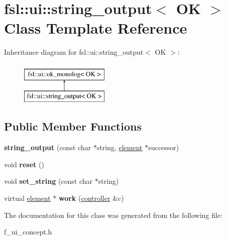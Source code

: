 \hypertarget{classfsl_1_1ui_1_1string__output}{}\section{fsl\+::ui\+::string\+\_\+output$<$ OK $>$ Class Template Reference}
\label{classfsl_1_1ui_1_1string__output}
Inheritance diagram for fsl\+::ui\+::string\+\_\+output$<$ OK $>$\+:\begin{figure}[H]
\begin{center}
\leavevmode
\includegraphics[height=2.000000cm]{classfsl_1_1ui_1_1string__output}
\end{center}
\end{figure}
\subsection*{Public Member Functions}
\begin{DoxyCompactItemize}
\item 
\mbox{\label{classfsl_1_1ui_1_1string__output_a064b0a4a4db91b01c534e4c43425d2f7}} 
{\bfseries string\+\_\+output} (const char $\ast$string, \mbox{\hyperlink{classfsl_1_1ui_1_1element}{element}} $\ast$successor)
\item 
\mbox{\label{classfsl_1_1ui_1_1string__output_aacc91cbaa65c65e58f446d216e318d5c}} 
void {\bfseries reset} ()
\item 
\mbox{\label{classfsl_1_1ui_1_1string__output_a6d0e90b2996cb8ede0fd14277cb212a0}} 
void {\bfseries set\+\_\+string} (const char $\ast$string)
\item 
\mbox{\label{classfsl_1_1ui_1_1string__output_a7aeec3c6b036dd4043a6585f0b162922}} 
virtual \mbox{\hyperlink{classfsl_1_1ui_1_1element}{element}} $\ast$ {\bfseries work} (\mbox{\hyperlink{classfsl_1_1ui_1_1controller}{controller}} \&c)
\end{DoxyCompactItemize}


The documentation for this class was generated from the following file\+:\begin{DoxyCompactItemize}
\item 
f\+\_\+ui\+\_\+concept.\+h\end{DoxyCompactItemize}
